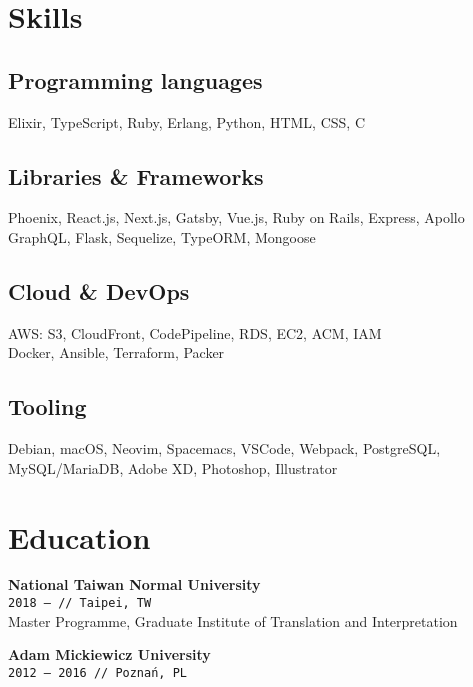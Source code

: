 \documentclass[10pt,a4paper]{article}
\newcommand{\project}[3]{\par\vspace{1em}\textbf{\normalsize #1}\\{\footnotesize\texttt{#2 // #3}}\\[4pt]}
\begin{document}
\begin{minipage}[t]{0.3\textwidth}
  \raggedright
  \section{Skills}

  \subsection{Programming languages}

  \small
  Elixir, TypeScript, Ruby, Erlang, Python, HTML, CSS, C
  \vspace{4pt}

  \subsection{Libraries \& Frameworks}

  \small
  Phoenix, React.js, Next.js, Gatsby, Vue.js, Ruby on Rails, Express, Apollo GraphQL, Flask, Sequelize, TypeORM, Mongoose
  \vspace{4pt}

  \subsection{Cloud \& DevOps}

  \small
  AWS: S3, CloudFront, CodePipeline, RDS, EC2, ACM, IAM\\ Docker, Ansible, Terraform, Packer
  \vspace{4pt}

  \subsection{Tooling}

  \small
  Debian, macOS, Neovim, Spacemacs, VSCode, Webpack, PostgreSQL, MySQL/MariaDB, Adobe XD, Photoshop, Illustrator
  \vspace{12pt}

  \section{Education}
  \vspace{-6pt}

  \project{National Taiwan Normal University}{2018 {–}}{Taipei, TW}

  \small Master Programme, Graduate Institute of Translation and Interpretation

  \project{Adam Mickiewicz University}{2012 {–} 2016}{Poznań, PL}


\end{minipage}
\end{document}
